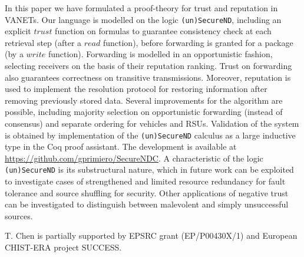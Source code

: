 \documentclass[compsoc, conference, letterpaper, 10pt, times]{IEEEtran}
\begin{document}
In this paper we have formulated a proof-theory for trust and reputation in VANETs. Our language is modelled on the logic \texttt{(un)SecureND}, including an explicit $trust$ function on formulas to guarantee consistency check at each retrieval step (after a $read$ function), before forwarding is granted for a package (by a $write$ function). Forwarding is modelled in an opportunistic fashion, selecting receivers on the basis of their reputation ranking. Trust on forwarding also guarantees correctness on transitive transmissions. Moreover, reputation is used to implement the resolution protocol for restoring information after removing previously stored data. Several improvements for the algorithm are possible, including majority selection on opportunistic forwarding (instead of consensus) and separate ordering for vehicles and RSUs. 
Validation of the system is obtained by implementation of the \texttt{(un)SecureND} calculus as a large inductive type in the Coq proof assistant. The development is available at \url{https://github.com/gprimiero/SecureNDC}. 
A characteristic of the logic \texttt{(un)SecureND} is its substructural nature, which in future work can be exploited to investigate cases of strengthened and limited resource redundancy for fault tolerance and source shuffling for security. Other applications of negative trust can be investigated to distinguish between malevolent and simply unsuccessful sources.

\smallskip

 T. Chen is partially supported by  
 EPSRC grant (EP/P00430X/1) and European CHIST-ERA project SUCCESS.

%
%
%
\end{document}
